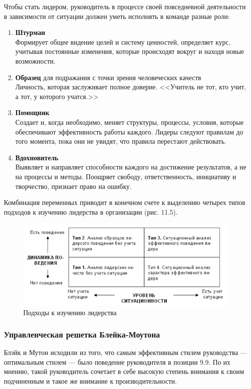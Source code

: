 \documentclass[a4paper,12pt,oneside,final]{extarticle}
\makeatletter
\numberwithin{equation}{section}
\def\maxwidth#1{\ifdim\Gin@nat@width>#1 #1\else\Gin@nat@width\fi}
\makeatother
\begin{document}
Чтобы стать лидером, руководитель в процессе своей повседневной деятельности в зависимости от ситуации должен уметь исполнять в команде разные роли:
\begin{enumerate}
	\item \textbf{Штурман} \\
	Формирует общее видение целей и систему ценностей, определяет курс, учитывая постоянные изменения, которые происходят вокруг и находя новые возможности.
	\item \textbf{Образец} для подражания с точки зрения человеческих качеств \\
	Личность, которая заслуживает полное доверие. 
	<<Учитель не тот, кто учит, а тот, у которого учатся.>>
	\item \textbf{Помощник} \\
	Создает и, когда необходимо, меняет структуры, процессы, условия, которые обеспечивают эффективность работы каждого.
	Лидеры следуют правилам до того момента, пока они не увидят, что правила перестают действовать.
	\item \textbf{Вдохновитель} \\ 
	Выявляет и направляет способности каждого на достижение результатов, а не на процессы и методы. 
	Поощряет свободу, ответственность, инициативу и творчество, признает право на ошибку.
\end{enumerate}

Комбинация переменных приводит в конечном счете к выделению четырех типов подходов к изучению лидерства в организации (рис. 11.5).

\begin{figure}[h]
	\centering
	\includegraphics[width=\maxwidth{\textwidth}]{management-figures/leadership_methods}
	\caption{Подходы к изучению лидерства}
	\label{leadership_methods}
\end{figure}

\subsubsection{Управленческая решетка Блейка-Моутона}
Блэйк и Мутон исходили из того, что самым эффективным стилем руководства --- оптимальным стилем --- было поведение руководителя в позиции 9.9. 
По их мнению, такой руководитель сочетает в себе высокую степень внимания к своим подчиненным и такое же внимание к производительности.
\end{document}

